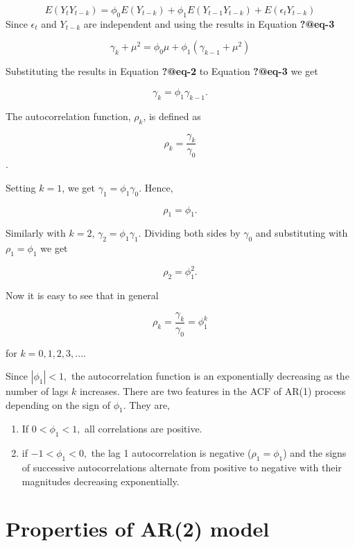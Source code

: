 \documentclass[
  11pt,
  a4paper,
]{report}
\begin{document}
\[E(Y_tY_{t-k})=\phi_0E(Y_{t-k})+\phi_1 E(Y_{t-1}Y_{t-k})+E(\epsilon_tY_{t-k})\]
Since \(\epsilon_t\) and \(Y_{t-k}\) are independent and using the
results in Equation \textbf{?@eq-3}

\[\gamma_k + \mu^2 = \phi_0 \mu+\phi_1(\gamma_{k-1}+\mu^2)\]

Substituting the results in Equation \textbf{?@eq-2} to Equation
\textbf{?@eq-3} we get

\begin{equation}
\gamma_k = \phi_1 \gamma_{k-1}.
\end{equation}

The autocorrelation function, \(\rho_k\), is defined as

\[\rho_k = \frac{\gamma_k}{\gamma_0}\].

Setting \(k=1\), we get \(\gamma_1 = \phi_1\gamma_0.\) Hence,

\[\rho_1=\phi_1.\]

Similarly with \(k=2\), \(\gamma_2 = \phi_1 \gamma_1\). Dividing both
sides by \(\gamma_0\) and substituting with \(\rho_1=\phi_1\) we get

\[\rho_2=\phi_1^2.\]

Now it is easy to see that in general

\begin{equation}
\rho_k = \frac{\gamma_k}{\gamma_0}=\phi_1^k 
\end{equation}

for \(k=0, 1, 2, 3, ...\).

Since \(|\phi_1| < 1,\) the autocorrelation function is an exponentially
decreasing as the number of lags \(k\) increases. There are two features
in the ACF of AR(1) process depending on the sign of \(\phi_1\). They
are,

\begin{enumerate}
\def\labelenumi{\arabic{enumi}.}
\item
  If \(0 < \phi_1 < 1,\) all correlations are positive.
\item
  if \(-1 < \phi_1 < 0,\) the lag 1 autocorrelation is negative
  (\(\rho_1=\phi_1\)) and the signs of successive autocorrelations
  alternate from positive to negative with their magnitudes decreasing
  exponentially.
\end{enumerate}

\section{Properties of AR(2) model}\label{properties-of-ar2-model}
\end{document}
